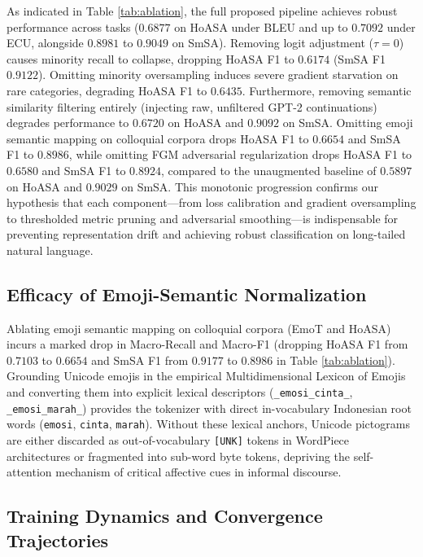 \documentclass{ieeeaccess}
\begin{document}
As indicated in Table \ref{tab:ablation}, the full proposed pipeline achieves robust performance across tasks ($0.6877$ on HoASA under BLEU and up to $0.7092$ under ECU, alongside $0.8981$ to $0.9049$ on SmSA). Removing logit adjustment ($\tau=0$) causes minority recall to collapse, dropping HoASA F1 to $0.6174$ (SmSA F1 $0.9122$). Omitting minority oversampling induces severe gradient starvation on rare categories, degrading HoASA F1 to $0.6435$. Furthermore, removing semantic similarity filtering entirely (injecting raw, unfiltered GPT-2 continuations) degrades performance to $0.6720$ on HoASA and $0.9092$ on SmSA. Omitting emoji semantic mapping on colloquial corpora drops HoASA F1 to $0.6654$ and SmSA F1 to $0.8986$, while omitting FGM adversarial regularization drops HoASA F1 to $0.6580$ and SmSA F1 to $0.8924$, compared to the unaugmented baseline of $0.5897$ on HoASA and $0.9029$ on SmSA. This monotonic progression confirms our hypothesis that each component—from loss calibration and gradient oversampling to thresholded metric pruning and adversarial smoothing—is indispensable for preventing representation drift and achieving robust classification on long-tailed natural language.

\subsection{Efficacy of Emoji-Semantic Normalization}
\label{subsec:emoji_ablation}

Ablating emoji semantic mapping on colloquial corpora (EmoT and HoASA) incurs a marked drop in Macro-Recall and Macro-F1 (dropping HoASA F1 from $0.7103$ to $0.6654$ and SmSA F1 from $0.9177$ to $0.8986$ in Table \ref{tab:ablation}). Grounding Unicode emojis in the empirical Multidimensional Lexicon of Emojis \cite{godard2022multidimensional} and converting them into explicit lexical descriptors (\texttt{\_emosi\_cinta\_}, \texttt{\_emosi\_marah\_}) provides the tokenizer with direct in-vocabulary Indonesian root words (\texttt{emosi}, \texttt{cinta}, \texttt{marah}). Without these lexical anchors, Unicode pictograms are either discarded as out-of-vocabulary \texttt{[UNK]} tokens in WordPiece architectures or fragmented into sub-word byte tokens, depriving the self-attention mechanism of critical affective cues in informal discourse.

\subsection{Training Dynamics and Convergence Trajectories}
\label{subsec:convergence}
\end{document}
